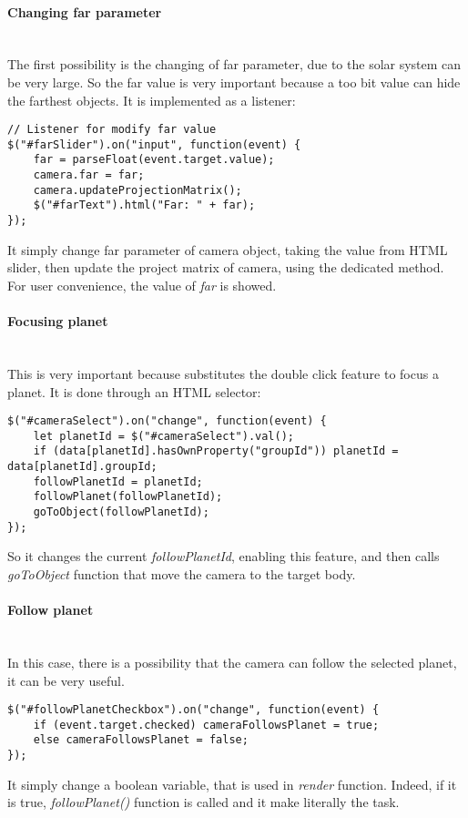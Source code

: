 \documentclass{article}
\begin{document}
\paragraph{Changing far parameter}\mbox{}\\
The first possibility is the changing of far parameter, due to the solar system can be very large. So the far value is very important because a too bit value can hide the farthest objects. It is implemented as a listener:
\begin{lstlisting}
// Listener for modify far value
$("#farSlider").on("input", function(event) {
	far = parseFloat(event.target.value);
	camera.far = far;
	camera.updateProjectionMatrix();
	$("#farText").html("Far: " + far);
});
\end{lstlisting}
It simply change far parameter of camera object, taking the value from HTML slider, then update the project matrix of camera, using the dedicated method. For user convenience, the value of \textit{far} is showed.
\paragraph{Focusing planet}\mbox{}\\
This is very important because substitutes the double click feature to focus a planet. It is done through an HTML selector:
\begin{lstlisting}
$("#cameraSelect").on("change", function(event) {
	let planetId = $("#cameraSelect").val();
	if (data[planetId].hasOwnProperty("groupId")) planetId = data[planetId].groupId;
	followPlanetId = planetId;
	followPlanet(followPlanetId);
	goToObject(followPlanetId);
});
\end{lstlisting}
So it changes the current \textit{followPlanetId}, enabling this feature, and then calls \textit{goToObject} function that move the camera to the target body.

\paragraph{Follow planet}\mbox{}\\
In this case, there is a possibility that the camera can follow the selected planet, it can be very useful.
\begin{lstlisting}
$("#followPlanetCheckbox").on("change", function(event) {
	if (event.target.checked) cameraFollowsPlanet = true;
	else cameraFollowsPlanet = false;
});
\end{lstlisting}
It simply change a boolean variable, that is used in \textit{render} function. Indeed, if it is true, \textit{followPlanet()} function is called and it make literally the task.
\end{document}

